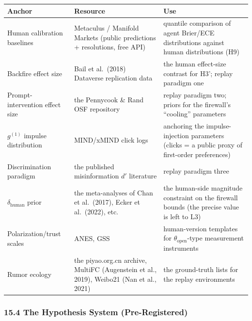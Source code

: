 \documentclass[
  11pt]{article}
\begin{document}
\begin{longtable}[]{@{}
  >{\raggedright\arraybackslash}p{}
  >{\raggedright\arraybackslash}p{}
  >{\raggedright\arraybackslash}p{}@{}}
\toprule\noalign{}
\begin{minipage}[b]{\linewidth}\raggedright
Anchor
\end{minipage} & \begin{minipage}[b]{\linewidth}\raggedright
Resource
\end{minipage} & \begin{minipage}[b]{\linewidth}\raggedright
Use
\end{minipage} \\
\midrule\noalign{}
\endhead
\bottomrule\noalign{}
\endlastfoot
Human calibration baselines & Metaculus / Manifold Markets (public
predictions + resolutions, free API) & quantile comparison of agent
Brier/ECE distributions against human distributions (H9) \\
Backfire effect size & Bail et al.~(2018) Dataverse replication data &
the human effect-size contrast for H3'; replay paradigm one \\
Prompt-intervention effect size & the Pennycook \& Rand OSF repository &
replay paradigm two; priors for the firewall's ``cooling'' parameters \\
\(g^{(1)}\) impulse distribution & MIND/xMIND click logs & anchoring the
impulse-injection parameters (clicks = a public proxy of first-order
preferences) \\
Discrimination paradigm & the published misinformation \(d'\) literature
& replay paradigm three \\
\(\delta_{\mathrm{human}}\) prior & the meta-analyses of Chan et
al.~(2017), Ecker et al.~(2022), etc. & the human-side magnitude
constraint on the firewall bounds (the precise value is left to L3) \\
Polarization/trust scales & ANES, GSS & human-version templates for
\(\theta_{\mathrm{open}}\)-type measurement instruments \\
Rumor ecology & the piyao.org.cn archive, MultiFC (Augenstein et al.,
2019), Weibo21 (Nan et al., 2021) & the ground-truth lists for the
replay environments \\
\end{longtable}

\subsubsection{15.4 The Hypothesis System
(Pre-Registered)}\label{the-hypothesis-system-pre-registered}
\end{document}
